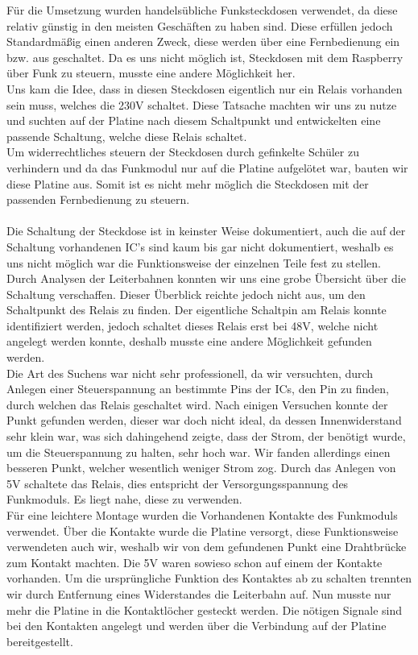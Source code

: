 Für die Umsetzung wurden handelsübliche Funksteckdosen verwendet, da diese relativ günstig in den meisten Geschäften zu haben sind. Diese erfüllen jedoch Standardmäßig einen anderen Zweck, diese werden über eine Fernbedienung ein bzw. aus geschaltet. Da es uns nicht möglich ist, Steckdosen mit dem Raspberry über Funk zu steuern, musste eine andere Möglichkeit her.\\
Uns kam die Idee, dass in diesen Steckdosen eigentlich nur ein Relais vorhanden sein muss, welches die 230V schaltet. Diese Tatsache machten wir uns zu nutze und suchten auf der Platine nach diesem Schaltpunkt und entwickelten eine passende Schaltung, welche diese Relais schaltet.\\
Um widerrechtliches steuern der Steckdosen durch gefinkelte Schüler zu verhindern und da das Funkmodul nur auf die Platine aufgelötet war, bauten wir diese Platine aus. Somit ist es nicht mehr möglich die Steckdosen mit der passenden Fernbedienung zu steuern.\\\\
Die Schaltung der Steckdose ist in keinster Weise dokumentiert, auch die auf der Schaltung vorhandenen IC's sind kaum bis gar nicht dokumentiert, weshalb es uns nicht möglich war die Funktionsweise der einzelnen Teile fest zu stellen. Durch Analysen der Leiterbahnen konnten wir uns eine grobe Übersicht über die Schaltung verschaffen. Dieser Überblick reichte jedoch nicht aus, um den Schaltpunkt des Relais zu finden. Der eigentliche Schaltpin am Relais konnte identifiziert werden, jedoch schaltet dieses Relais erst bei 48V, welche nicht angelegt werden konnte, deshalb musste eine andere Möglichkeit gefunden werden.\\ 
Die Art des Suchens war nicht sehr professionell, da wir versuchten, durch Anlegen einer Steuerspannung an bestimmte Pins der ICs, den Pin zu finden, durch welchen das Relais geschaltet wird. Nach einigen Versuchen konnte der Punkt gefunden werden, dieser war doch nicht ideal, da dessen Innenwiderstand sehr klein war, was sich dahingehend zeigte, dass der Strom, der benötigt wurde, um die Steuerspannung zu halten, sehr hoch war. Wir fanden allerdings einen besseren Punkt, welcher wesentlich weniger Strom zog. Durch das Anlegen von 5V schaltete das Relais, dies entspricht der Versorgungsspannung des Funkmoduls. Es liegt nahe, diese zu verwenden.\\
Für eine leichtere Montage wurden die Vorhandenen Kontakte des Funkmoduls verwendet. Über die Kontakte wurde die Platine versorgt, diese Funktionsweise verwendeten auch wir, weshalb wir von dem gefundenen Punkt eine Drahtbrücke zum Kontakt machten. Die 5V waren sowieso schon auf einem der Kontakte vorhanden. Um die ursprüngliche Funktion des Kontaktes ab zu schalten trennten wir durch Entfernung eines Widerstandes die Leiterbahn auf. Nun musste nur mehr die Platine in die Kontaktlöcher gesteckt werden. Die nötigen Signale sind bei den Kontakten angelegt und werden über die Verbindung auf der Platine bereitgestellt.\\
